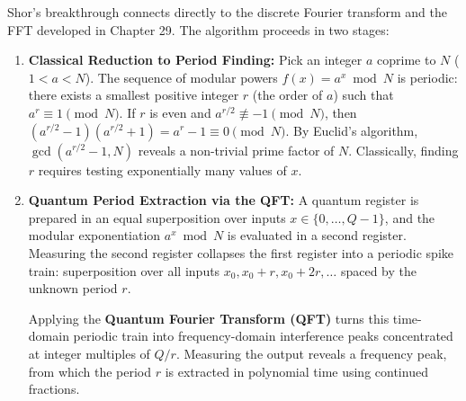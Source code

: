 Shor's breakthrough connects directly to the discrete Fourier transform and the FFT
developed in Chapter 29. The algorithm proceeds in two stages:
\begin{enumerate}
  \item \textbf{Classical Reduction to Period Finding:}
  Pick an integer $a$ coprime to $N$ ($1 < a < N$). The sequence of modular powers
  $f(x) = a^x \bmod N$ is periodic: there exists a smallest positive integer $r$ (the
  order of $a$) such that $a^r \equiv 1 \pmod N$.
  If $r$ is even and $a^{r/2} \not\equiv -1 \pmod N$, then
  $(a^{r/2}-1)(a^{r/2}+1) = a^r - 1 \equiv 0 \pmod N$.
  By Euclid's algorithm, $\gcd(a^{r/2}-1, N)$ reveals a non-trivial prime factor of $N$.
  Classically, finding $r$ requires testing exponentially many values of $x$.

  \item \textbf{Quantum Period Extraction via the QFT:}
  A quantum register is prepared in an equal superposition over inputs $x \in \{0, \dots, Q-1\}$,
  and the modular exponentiation $a^x \bmod N$ is evaluated in a second register.
  Measuring the second register collapses the first register into a periodic spike train:
  superposition over all inputs $x_0, x_0 + r, x_0 + 2r, \dots$ spaced by the unknown period $r$.
  
  Applying the \textbf{Quantum Fourier Transform (QFT)} turns this time-domain periodic
  train into frequency-domain interference peaks concentrated at integer multiples of
  $Q/r$. Measuring the output reveals a frequency peak, from which the period $r$ is
  extracted in polynomial time using continued fractions.
\end{enumerate}


